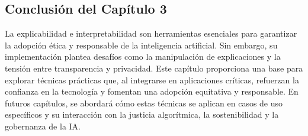 \begin{refsection}
\section{Conclusión del Capítulo 3}
La explicabilidad e interpretabilidad son herramientas esenciales para garantizar la adopción ética y responsable de la inteligencia artificial. Sin embargo, su implementación plantea desafíos como la manipulación de explicaciones y la tensión entre transparencia y privacidad. Este capítulo proporciona una base para explorar técnicas prácticas que, al integrarse en aplicaciones críticas, refuerzan la confianza en la tecnología y fomentan una adopción equitativa y responsable. En futuros capítulos, se abordará cómo estas técnicas se aplican en casos de uso específicos y su interacción con la justicia algorítmica, la sostenibilidad y la gobernanza de la IA.


\nocite{*}

\printbibliography[heading=subbibliography, title={Bibliografía del Capítulo 3}]
\end{refsection}
